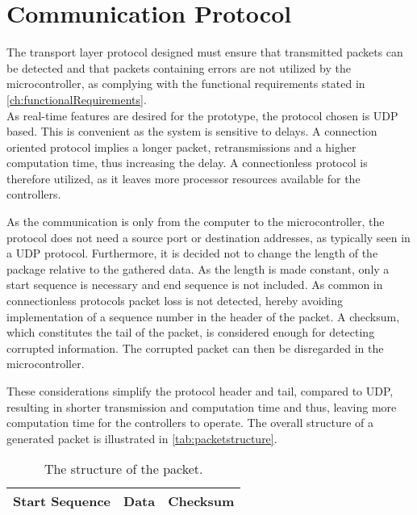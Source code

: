 \section{Communication Protocol}
The transport layer protocol designed must ensure that transmitted packets can be detected and that packets containing errors are not utilized by the microcontroller, as complying with the functional requirements stated in \autoref{ch:functionalRequirements}.\\
%
As real-time features are desired for the prototype, the protocol chosen is UDP based. This is convenient as the system is sensitive to delays. A connection oriented protocol implies a longer packet, retransmissions and a higher computation time, thus increasing the delay. A connectionless protocol is therefore utilized, as it leaves more processor resources available for the controllers.

As the communication is only from the computer to the microcontroller, the protocol does not need a source port or destination addresses, as typically seen in a UDP protocol. Furthermore, it is decided not to change the length of the package relative to the gathered data. As the length is made constant, only a start sequence is necessary and end sequence is not included. As common in connectionless protocols packet loss is not detected, hereby avoiding implementation of a sequence number in the header of the packet. A checksum, which constitutes the tail of the packet, is considered enough for detecting corrupted information. The corrupted packet can then be disregarded in the microcontroller. 

These considerations simplify the protocol header and tail, compared to UDP, resulting in shorter transmission and computation time and thus, leaving more computation time for the controllers to operate. The overall structure of a generated packet is illustrated in \autoref{tab:packetstructure}.
\begin{table}[H]\centering
\begin{tabular}{|>{\centering\arraybackslash}m{3cm}|>{\centering\arraybackslash}m{2cm}|>{\centering\arraybackslash}m{2cm}|}
\hline
Start Sequence & Data & Checksum \\
\hline
\end{tabular}
\caption{The structure of the packet.}
\label{tab:packetstructure}
\end{table}

